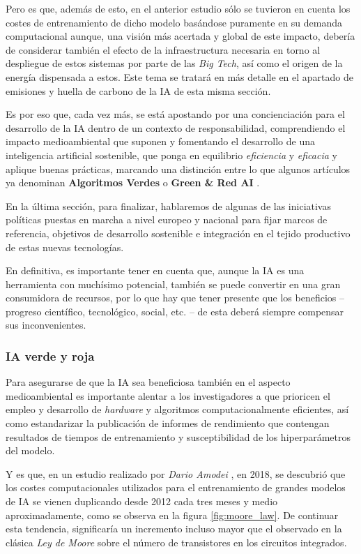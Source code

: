 \documentclass[00-Trabajo_Final.tex]{subfiles}
\begin{document}
Pero es que, además de esto, en el anterior estudio sólo se tuvieron en cuenta los costes de entrenamiento de dicho modelo basándose puramente en su demanda computacional aunque, una visión más acertada y global de este impacto, debería de considerar también el efecto de la infraestructura necesaria en torno al despliegue de estos sistemas por parte de las \textit{Big Tech}, así como el origen de la energía dispensada a estos. Este tema se tratará en más detalle en el apartado de emisiones y huella de carbono de la IA de esta misma sección.

Es por eso que, cada vez más, se está apostando por una concienciación para el desarrollo de la IA dentro de un contexto de responsabilidad, comprendiendo el impacto medioambiental que suponen y fomentando el desarrollo de una inteligencia artificial sostenible, que ponga en equilibrio \textit{eficiencia} y \textit{eficacia} y aplique buenas prácticas, marcando una distinción entre lo que algunos artículos ya denominan \textbf{Algoritmos Verdes} \cite{carbon_computation} o \textbf{Green \& Red AI} \cite{green_red_ai}.

En la última sección, para finalizar, hablaremos de algunas de las iniciativas políticas puestas en marcha a nivel europeo y nacional para fijar marcos de referencia, objetivos de desarrollo sostenible e integración en el tejido productivo de estas nuevas tecnologías.

En definitiva, es importante tener en cuenta que, aunque la IA es una herramienta con muchísimo potencial, también se puede convertir en una gran consumidora de recursos, por lo que hay que tener presente que los beneficios{ }--{ }progreso científico, tecnológico, social, etc.{ }--{ }de esta deberá siempre compensar sus inconvenientes.

\subsubsection{IA verde y roja}
\label{ss:green_ia}

Para asegurarse de que la IA sea beneficiosa también en el aspecto medioambiental es importante alentar a los investigadores a que prioricen el empleo y desarrollo de \textit{hardware} y algoritmos computacionalmente eficientes, así como estandarizar la publicación de informes de rendimiento que contengan resultados de tiempos de entrenamiento y susceptibilidad de los hiperparámetros del modelo.

Y es que, en un estudio realizado por \textit{Dario Amodei} \cite{openai_compute}, en 2018, se descubrió que los costes computacionales utilizados para el entrenamiento de grandes modelos de IA se vienen duplicando desde 2012 cada tres meses y medio aproximadamente, como se observa en la figura \ref{fig:moore_law}. De continuar esta tendencia, significaría un incremento incluso mayor que el observado en la clásica \textit{Ley de Moore} sobre el número de transistores en los circuitos integrados.
\end{document}
